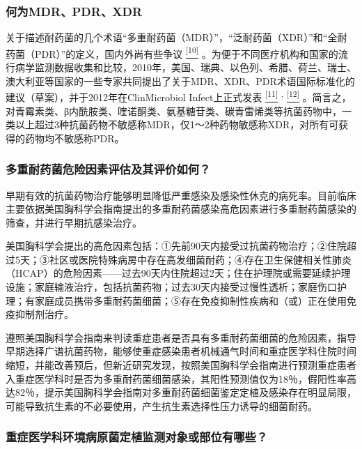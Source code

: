 \subsubsection{何为MDR、PDR、XDR}

关于描述耐药菌的几个术语“多重耐药菌（MDR）”，“泛耐药菌（XDR）”和“全耐药菌（PDR）”的定义，国内外尚有些争议
\protect\hyperlink{text00031.htmlux5cux23ch10-30}{\textsuperscript{{[}10{]}}}
。为便于不同医疗机构和国家的流行病学监测数据收集和比较，2010年，美国、瑞典、以色列、希腊、荷兰、瑞士、澳大利亚等国家的一些专家共同提出了关于MDR、XDR、PDR术语国际标准化的建议（草案），并于2012年在ClinMicrobiol
Infect上正式发表
\protect\hyperlink{text00031.htmlux5cux23ch11-30}{\textsuperscript{{[}11{]}}}
\textsuperscript{,}
\protect\hyperlink{text00031.htmlux5cux23ch12-30}{\textsuperscript{{[}12{]}}}
。简言之，对青霉素类、β内酰胺类、喹诺酮类、氨基糖苷类、碳青雷烯类等抗菌药物中，一类以上超过3种抗菌药物不敏感称MDR，仅1～2种药物敏感称XDR，对所有可获得的药物均不敏感称PDR。

\subsubsection{多重耐药菌危险因素评估及其评价如何？}

早期有效的抗菌药物治疗能够明显降低严重感染及感染性休克的病死率。目前临床主要依据美国胸科学会指南提出的多重耐药菌感染高危因素进行多重耐药菌感染的筛查，并进行早期抗感染治疗。

美国胸科学会提出的高危因素包括：①先前90天内接受过抗菌药物治疗；②住院超过5天；③社区或医院特殊病房中存在高发细菌耐药；④存在卫生保健相关性肺炎（HCAP）的危险因素------过去90天内住院超过2天；住在护理院或需要延续护理设施；家庭输液治疗，包括抗菌药物；过去30天内接受过慢性透析；家庭伤口护理；有家庭成员携带多重耐药菌细菌；⑤存在免疫抑制性疾病和（或）正在使用免疫抑制剂治疗。

遵照美国胸科学会指南来判读重症患者是否具有多重耐药菌细菌的危险因素，指导早期选择广谱抗菌药物，能够使重症感染患者机械通气时间和重症医学科住院时间缩短，并能改善预后，但新近研究发现，按照美国胸科学会指南进行预测重症患者入重症医学科时是否为多重耐药菌细菌感染，其阳性预测值仅为18％，假阳性率高达82％，提示美国胸科学会指南对多重耐药菌细菌鉴定定植及感染存在明显局限，可能导致抗生素的不必要使用，产生抗生素选择性压力诱导的细菌耐药。

\subsubsection{重症医学科环境病原菌定植监测对象或部位有哪些？}

